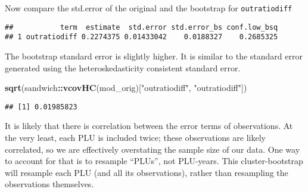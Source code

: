 \documentclass[]{article}
\newenvironment{Shaded}{\begin{snugshade}}{\end{snugshade}}
\newcommand{\KeywordTok}[1]{\textcolor[rgb]{0.13,0.29,0.53}{\textbf{#1}}}
\newcommand{\DataTypeTok}[1]{\textcolor[rgb]{0.13,0.29,0.53}{#1}}
\newcommand{\StringTok}[1]{\textcolor[rgb]{0.31,0.60,0.02}{#1}}
\newcommand{\OtherTok}[1]{\textcolor[rgb]{0.56,0.35,0.01}{#1}}
\newcommand{\OperatorTok}[1]{\textcolor[rgb]{0.81,0.36,0.00}{\textbf{#1}}}
\newcommand{\NormalTok}[1]{#1}
\begin{document}
Now compare the std.error of the original and the bootstrap for
\texttt{outratiodiff}

\begin{Shaded}
\end{Shaded}

\begin{verbatim}
##           term  estimate  std.error std.error_bs conf.low_bsq
## 1 outratiodiff 0.2274375 0.01433042    0.0188327    0.2685325
\end{verbatim}

The bootstrap standard error is slightly higher. It is similar to the
standard error generated using the heteroskedasticity consistent
standard error.

\begin{Shaded}
\begin{Highlighting}[]
\KeywordTok{sqrt}\NormalTok{(sandwich}\OperatorTok{::}\KeywordTok{vcovHC}\NormalTok{(mod_orig)[}\StringTok{"outratiodiff"}\NormalTok{, }\StringTok{"outratiodiff"}\NormalTok{])}
\end{Highlighting}
\end{Shaded}

\begin{verbatim}
## [1] 0.01985823
\end{verbatim}

It is likely that there is correlation between the error terms of
observations. At the very least, each PLU is included twice; these
observations are likely correlated, so we are effectively overstating
the sample size of our data. One way to account for that is to resample
``PLUs'', not PLU-years. This cluster-bootstrap will resample each PLU
(and all its observations), rather than resampling the observations
themselves.
\end{document}
